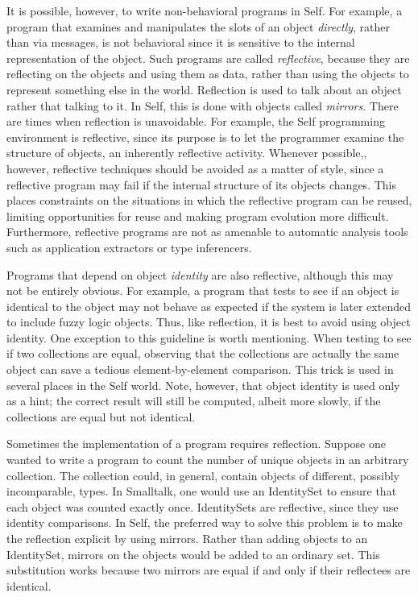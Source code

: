 \documentclass[letterpaper,10pt,english]{sphinxmanual}
\begin{document}
It is possible, however, to write non-behavioral programs in Self. For example, a program that examines
and manipulates the slots of an object \emph{directly}, rather than via messages, is not behavioral
since it is sensitive to the internal representation of the object. Such programs are called \emph{reflective},
because they are reflecting on the objects and using them as data, rather than using the objects to
represent something else in the world. Reflection is used to talk about an object rather that talking
to it. In Self, this is done with objects called \emph{mirrors}. There are times when reflection is unavoidable.
For example, the Self programming environment is reflective, since its purpose is to let the
programmer examine the structure of objects, an inherently reflective activity. Whenever possible,,
however, reflective techniques should be avoided as a matter of style, since a reflective program
may fail if the internal structure of its objects changes. This places constraints on the situations in
which the reflective program can be reused, limiting opportunities for reuse and making program
evolution more difficult. Furthermore, reflective programs are not as amenable to automatic analysis
tools such as application extractors or type inferencers.

Programs that depend on object \emph{identity} are also reflective, although this may not be entirely obvious.
For example, a program that tests to see if an object is identical to the object  may not
behave as expected if the system is later extended to include fuzzy logic objects. Thus, like reflection,
it is best to avoid using object identity. One exception to this guideline is worth mentioning.
When testing to see if two collections are equal, observing that the collections are actually the
same object can save a tedious element-by-element comparison. This trick is used in several places
in the Self world. Note, however, that object identity is used only as a hint; the correct result will
still be computed, albeit more slowly, if the collections are equal but not identical.

Sometimes the implementation of a program requires reflection. Suppose one wanted to write a
program to count the number of unique objects in an arbitrary collection. The collection could, in
general, contain objects of different, possibly incomparable, types. In Smalltalk, one would use an
IdentitySet to ensure that each object was counted exactly once. IdentitySets are reflective, since
they use identity comparisons. In Self, the preferred way to solve this problem is to make the reflection
explicit by using mirrors. Rather than adding objects to an IdentitySet, mirrors on the objects
would be added to an ordinary set. This substitution works because two mirrors are equal if
and only if their reflectees are identical.
\end{document}

